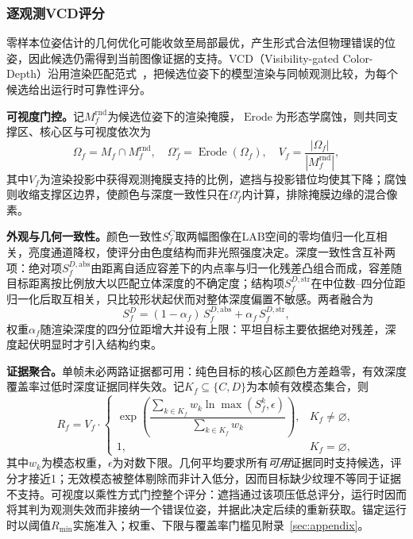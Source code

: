 \documentclass[review]{vgtc}
\begin{document}
\subsubsection{逐观测VCD评分}

零样本位姿估计的几何优化可能收敛至局部最优，产生形式合法但物理错误的位姿，因此候选仍需得到当前图像证据的支持。VCD（Visibility-gated Color-Depth）沿用渲染匹配范式~\cite{cosypose2020,megapose2022}，把候选位姿下的模型渲染与同帧观测比较，为每个候选给出运行时可靠性评分。

\textbf{可视度门控。}记$M_f^{\mathrm{rnd}}$为候选位姿下的渲染掩膜，$\operatorname{Erode}$为形态学腐蚀，则共同支撑区、核心区与可视度依次为
\begin{equation}
\Omega_f = M_f \cap M_f^{\mathrm{rnd}}, \quad \Omega_f^{\circ} = \operatorname{Erode}(\Omega_f), \quad V_f = \frac{|\Omega_f|}{|M_f^{\mathrm{rnd}}|},
\label{eq:visibility}
\end{equation}
其中$V_f$为渲染投影中获得观测掩膜支持的比例，遮挡与投影错位均使其下降；腐蚀则收缩支撑区边界，使颜色与深度一致性只在$\Omega_f^{\circ}$内计算，排除掩膜边缘的混合像素。

\textbf{外观与几何一致性。}颜色一致性$S_f^C$取两幅图像在LAB空间的零均值归一化互相关，亮度通道降权，使评分由色度结构而非光照强度决定。深度一致性含互补两项：绝对项$S_f^{D,\mathrm{abs}}$由距离自适应容差下的内点率与归一化残差凸组合而成，容差随目标距离按比例放大以匹配立体深度的不确定度；结构项$S_f^{D,\mathrm{str}}$在中位数--四分位距归一化后取互相关，只比较形状起伏而对整体深度偏置不敏感。两者融合为
\begin{equation}
S_f^D = (1-\alpha_f)\,S_f^{D,\mathrm{abs}} + \alpha_f\,S_f^{D,\mathrm{str}},
\label{eq:depth-score}
\end{equation}
权重$\alpha_f$随渲染深度的四分位距增大并设有上限：平坦目标主要依据绝对残差，深度起伏明显时才引入结构约束。

\textbf{证据聚合。}单帧未必两路证据都可用：纯色目标的核心区颜色方差趋零，有效深度覆盖率过低时深度证据同样失效。记$K_f \subseteq \{C, D\}$为本帧有效模态集合，则
\begin{equation}
R_f = V_f \cdot
\begin{cases}
\exp\!\left(\dfrac{\sum_{k \in K_f} w_k \ln \max(S_f^{k}, \epsilon)}{\sum_{k \in K_f} w_k}\right), & K_f \neq \varnothing, \\[6pt]
1, & K_f = \varnothing,
\end{cases}
\label{eq:vcd}
\end{equation}
其中$w_k$为模态权重，$\epsilon$为对数下限。几何平均要求所有\emph{可用}证据同时支持候选，评分才接近1；无效模态被整体剔除而非计入低分，因而目标缺少纹理不等同于证据不支持。可视度以乘性方式门控整个评分：遮挡通过该项压低总评分，运行时因而将其判为观测失效而非接纳一个错误位姿，并据此决定后续的重新获取。锚定运行时以阈值$R_{\min}$实施准入；权重、下限与覆盖率门槛见附录~\ref{sec:appendix}。
\end{document}
